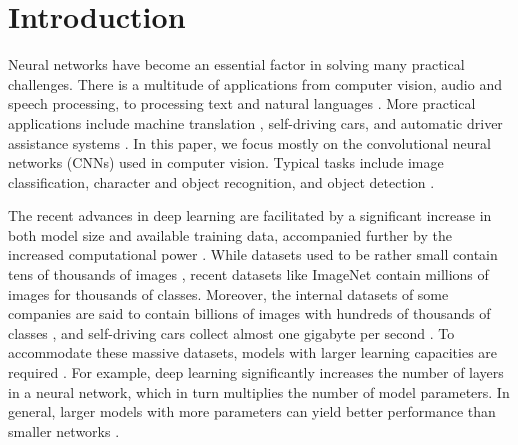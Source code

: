 \documentclass[conference,compsoc,a4paper]{IEEEtran}
\begin{document}
\section{Introduction} %
\label{sec:introduction}
%
%

Neural networks have become an essential factor in solving many practical challenges.
There is a multitude of applications from computer vision, audio and speech processing, to processing text and natural languages \cite{chen2016-Revisiting-distributed-synchronous-SGD,dean2012-Large-scale-distributed,yadan2013-Multi-GPU-Training}.
More practical applications include machine translation \cite{sutskever2014sequence}, self-driving cars, and automatic driver assistance systems \cite{jin2016-How-to-scale}.
%
In this paper, we focus mostly on the convolutional neural networks (CNNs) used in computer vision.
Typical tasks include image classification, character and object recognition, and object detection \cite{paine2013-GPU-async-SGD}.


The recent advances in deep learning are facilitated by a significant increase in both model size and available training data, accompanied further by the increased computational power \cite{chen2016-Revisiting-distributed-synchronous-SGD,chilimbi2014-Project-Adam}.
%
While datasets used to be rather small contain tens of thousands of images \cite{lecun1998gradient,krizhevsky2009CIFAR10}, recent datasets like ImageNet \cite{imagenet_cvpr09} contain millions of images for thousands of classes.
Moreover, the internal datasets of some companies are said to contain billions of images with hundreds of thousands of classes \cite{iandola2016-Firecaffe}, and self-driving cars collect almost one gigabyte per second \cite{jin2016-How-to-scale}.
%
To accommodate these massive datasets, models with larger learning capacities are required \cite{krizhevsky2012-AlexNet}.
For example, deep learning significantly increases the number of layers in a neural network, which in turn multiplies the number of model parameters.
In general, larger models with more parameters can yield better performance than smaller networks \cite{coates2013-DL-COTS-HPC,dean2012-Large-scale-distributed,krizhevsky2012-AlexNet}.
\end{document}
